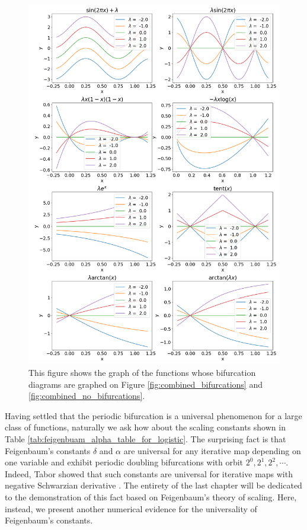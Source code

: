 \begin{figure}
	\centering
	\includegraphics[width=\textwidth]{./figures/combined_functions.png}
	\caption{
		This figure shows the graph of the functions whose bifurcation diagrams are graphed on Figure \ref{fig:combined_bifurcations} and \ref{fig:combined_no_bifurcations}.
	}
	\label{fig:combined_bifurcations_functions_graph}
\end{figure}


Having settled that the periodic bifurcation is a universal phenomenon for a large class of functions, naturally we ask how about the scaling constants shown in Table \ref{tab:feigenbuam_alpha_table_for_logistic}.
The surprising fact is that Feigenbaum's constants $\delta$ and $\alpha$ are universal for any iterative map depending on one variable and exhibit periodic doubling bifurcations with orbit $2^0, 2^1, 2^2, \cdots$. 
Indeed, Tabor showed that such constants are universal for iterative maps with negative Schwarzian derivative \cite{Tabor}.
The entirety of the last chapter will be dedicated to the demonstration of this fact based on Feigenbaum's theory of scaling. 
Here, instead, we present another numerical evidence for the universality of Feigenbaum's constants.

